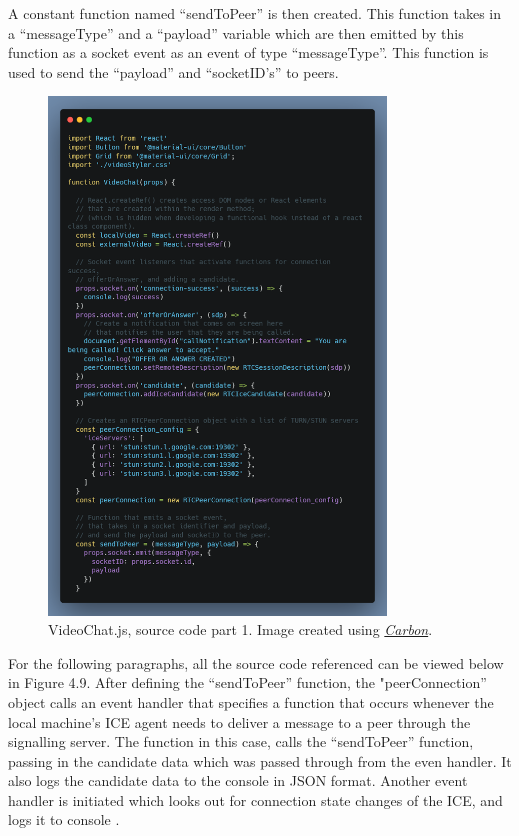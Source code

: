 A constant function named “sendToPeer” is then created. This function takes in a “messageType” and a “payload” variable which are then emitted by this function as a socket event as an event of type “messageType”. This function is used to send the “payload” and “socketID’s” to peers.
\begin{figure}[H]
    \centering
    \includegraphics[width=0.8\textwidth]{img/SystemDesign/videoChatJs_1.png}
    \caption{VideoChat.js, source code part 1. Image created using \href{https://carbon.now.sh/}{\textit{Carbon}}.}
\end{figure}

For the following paragraphs, all the source code referenced can be viewed below in Figure 4.9. After defining the “sendToPeer” function, the "peerConnection” object calls an event handler that specifies a function that occurs whenever the local machine’s ICE agent needs to deliver a message to a peer through the signalling server. The function in this case, calls the “sendToPeer” function, passing in the candidate data which was passed through from the even handler. It also logs the candidate data to the console in JSON format. Another event handler is initiated which looks out for connection state changes of the ICE, and logs it to console \cite{rtcpeerconnection}.

